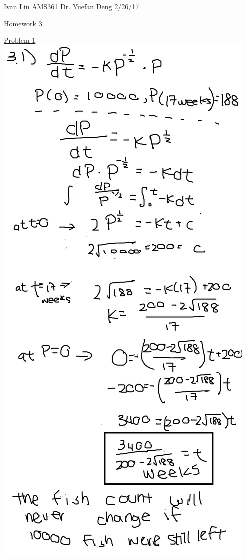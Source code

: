 \documentclass{article}
\begin{document}
Ivan Lin\newline{}
AMS361\newline{}
Dr. Yuefan Deng\newline{}
2/26/17\newline{}

\begin{center}
  Homework 3
\end{center}

\underline{Problem 1}\newline{}
\includegraphics[width=\textwidth,height=\textheight,keepaspectratio]{3-1.png}\clearpage{}
\end{document}
